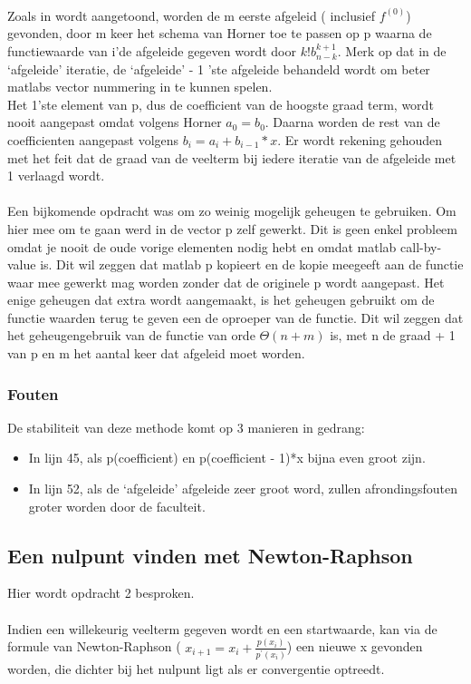 \documentclass[a4paper,kulak]{kulakarticle}
\begin{document}
~\\~\\~\\
Zoals in \cite{bultheel2006inleiding} wordt aangetoond, worden de m eerste afgeleid ( inclusief $f^{(0)}$) gevonden, door m keer het schema van Horner toe te passen op p waarna de functiewaarde van i'de afgeleide gegeven wordt door $k!b^{k+1}_{n-k}$. Merk op dat in de `afgeleide' iteratie, de `afgeleide' - 1 'ste afgeleide behandeld wordt om beter matlabs vector nummering in te kunnen spelen.\\
Het 1'ste element van p, dus de coefficient van de hoogste graad term, wordt nooit aangepast omdat volgens Horner $a_0 = b_0$. Daarna worden de rest van de coefficienten aangepast volgens $b_i = a_i + b_{i-1}*x$. Er wordt rekening gehouden met het feit dat de graad van de veelterm bij iedere iteratie van de afgeleide met 1 verlaagd wordt.
~\\~\\Een bijkomende opdracht was om zo weinig mogelijk geheugen te gebruiken. Om hier mee om te gaan werd in de vector p zelf gewerkt. Dit is geen enkel probleem omdat je nooit de oude vorige elementen nodig hebt en omdat matlab call-by-value is. Dit wil zeggen dat matlab p kopieert en de kopie meegeeft aan de functie waar mee gewerkt mag worden zonder dat de originele p wordt aangepast. 
Het enige geheugen dat extra wordt aangemaakt, is het geheugen gebruikt om de functie waarden terug te geven een de oproeper van de functie.
Dit wil zeggen dat het geheugengebruik van de functie van orde $\Theta( n + m )$ is, met n de graad + 1 van p en m het aantal keer dat afgeleid moet worden.

\subsubsection{Fouten}

De stabiliteit van deze methode komt op 3 manieren in gedrang:
\begin{itemize}
	\item In lijn 45, als p(coefficient) en p(coefficient - 1)*x bijna even groot zijn.
	\item In lijn 52, als de `afgeleide' afgeleide zeer groot word, zullen afrondingsfouten groter worden door de faculteit.
\end{itemize}


\subsection{Een nulpunt vinden met Newton-Raphson}
Hier wordt opdracht 2 besproken.
\\~\\
Indien een willekeurig veelterm gegeven wordt en een startwaarde, kan via de formule van Newton-Raphson (
$x_{i+1} = x_i + \frac{ p(x_i) }{ p^{'}(x_i) }$) een nieuwe x gevonden worden, die dichter bij het nulpunt ligt als er convergentie optreedt.
\end{document}

